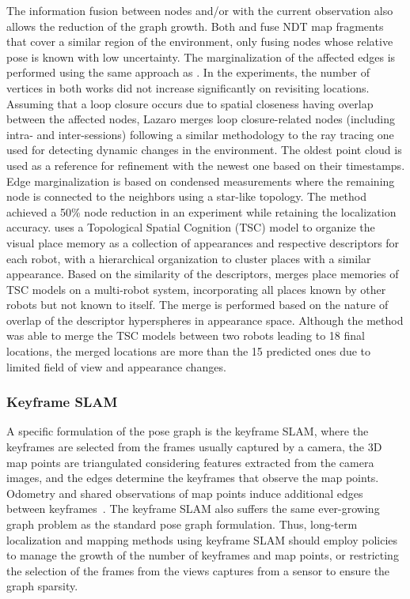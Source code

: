 The information fusion between nodes and/or with the current observation also allows the reduction of the graph growth.
Both \cite{einhorn-gross:2013:6698849} and \cite{einhorn-gross:2015:008} fuse NDT map fragments that cover a similar region of the environment, only fusing nodes whose relative pose is known with low uncertainty. The marginalization of the affected edges is performed using the same approach as \cite{kretzschmar-et-al:2010:2}. In the experiments, the number of vertices in both works did not increase significantly on revisiting locations.
Assuming that a loop closure occurs due to spatial closeness having overlap between the affected nodes, Lazaro merges loop closure-related nodes (including intra- and inter-sessions) following a similar methodology to the ray tracing one used for detecting dynamic changes in the environment. The oldest point cloud is used as a reference for refinement with the newest one based on their timestamps. Edge marginalization is based on condensed measurements where the remaining node is connected to the neighbors using a star-like topology. The method achieved a 50\% node reduction in an experiment while retaining the localization accuracy.
\cite{karaoguz-bozma:2020:2} uses a Topological Spatial Cognition (TSC) model to organize the visual place memory as a collection of appearances and respective descriptors for each robot, with a hierarchical organization to cluster places with a similar appearance. Based on the similarity of the descriptors, \cite{karaoguz-bozma:2020:2} merges place memories of TSC models on a multi-robot system, incorporating all places known by other robots but not known to itself. The merge is performed based on the nature of overlap of the descriptor hyperspheres in appearance space. Although the method was able to merge the TSC models between two robots leading to 18 final locations, the merged locations are more than the 15 predicted ones due to limited field of view and appearance changes.



\subsubsection{Keyframe SLAM}

A specific formulation of the pose graph is the keyframe SLAM, where the keyframes are selected from the frames usually captured by a camera, the 3D map points are triangulated considering features extracted from the camera images, and the edges determine the keyframes that observe the map points. Odometry and shared observations of map points induce additional edges between keyframes~\parencite{schmuck-chli:2019:00071}.
The keyframe SLAM also suffers the same ever-growing graph problem as the standard pose graph formulation. Thus, long-term localization and mapping methods using keyframe SLAM should employ policies to manage the growth of the number of keyframes and map points, or restricting the selection of the frames from the views captures from a sensor to ensure the graph sparsity.


